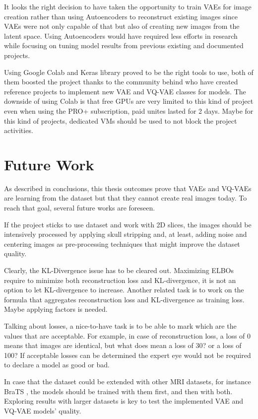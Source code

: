 It looks the right decision to have taken the opportunity to train VAEs for image creation rather than using Autoencoders to reconstruct existing images since VAEs were not only capable of that but also of creating new images from the latent space. Using Autoencoders would have required less efforts in research while focusing on tuning model results from previous existing and documented projects.

Using Google Colab and Keras library proved to be the right tools to use, both of them boosted the project thanks to the community behind who have created reference projects to implement new VAE and VQ-VAE classes for models. The downside of using Colab is that free GPUs are very limited to this kind of project even when using the PRO+ subscription, paid unites lasted for 2 days. Maybe for this kind of projects, dedicated VMs should be used to not block the project activities.

\section{Future Work}

As described in conclusions, this thesis outcomes prove that VAEs and VQ-VAEs are learning from the dataset but that they cannot create real images today. To reach that goal, several future works are foreseen.

If the project sticks to use  dataset and work with 2D slices, the images should be intensively processed by applying skull stripping and, at least, adding noise and centering images as pre-processing techniques that might improve the dataset quality.

Clearly, the KL-Divergence issue has to be cleared out. Maximizing ELBOs require to minimize both reconstruction loss and KL-divergence, it is not an option to let KL-divergence to increase. Another related task is to work on the formula that aggregates reconstruction loss and KL-divergence as training loss. Maybe applying factors is needed. 

Talking about losses, a nice-to-have task is to be able to mark which are the values that are acceptable. For example, in case of reconstruction loss, a loss of 0 means that images are identical, but what does mean a loss of 30? or a loss of 100? If acceptable losses can be determined the expert eye would not be required to declare a model as good or bad.

In case that the  dataset could be extended with other MRI datasets, for instance BraTS \cite{brats}, the models should be trained with them first, and then with both. Exploring results with larger datasets is key to test the implemented VAE and VQ-VAE models' quality.